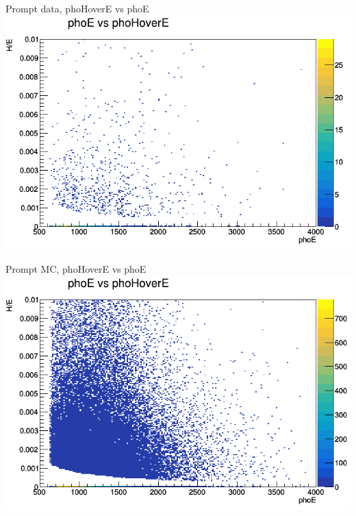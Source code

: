 \documentclass{beamer}
\begin{document}
\begin{frame}{Prompt data, phoHoverE vs phoE}
    \includegraphics[width=\linewidth]{phoE_vs_phoHoverE_anTGCtree_data_promptall.png}
\end{frame}
\begin{frame}{Prompt MC, phoHoverE vs phoE}
    \includegraphics[width=\linewidth]{phoE_vs_phoHoverE_anTGCtree_MC_prompt.png}
\end{frame}
\end{document}
